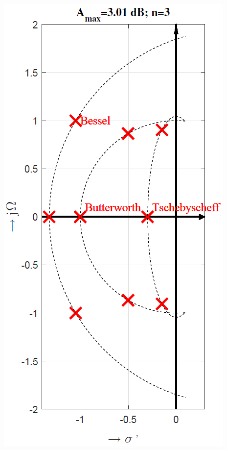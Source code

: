 \begin{minipage}[c]{0.28\columnwidth}
    \includegraphics[width=\columnwidth]{images/filter_vergleich_pollagen.png}
\end{minipage}

